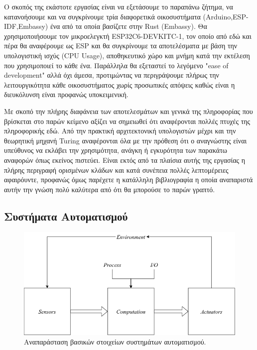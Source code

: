 Ο σκοπός της εκάστοτε εργασίας είναι να εξετάσουμε το παραπάνω ζήτημα,
να κατανοήσουμε και να συγκρίνουμε τρία διαφορετικά οικοσυστήματα
(Arduino,ESP-IDF,Embassy) ένα από τα οποία βασίζετε στην Rust
(Embassy). Θα χρησιμοποιήσουμε τον μικροελεγκτή ESP32C6-DEVKITC-1, τον
οποίο από εδώ και πέρα θα αναφέρουμε ως ESP και θα συγκρίνουμε τα
αποτελέσματα με βάση την υπολογιστική ισχύς (CPU Usage), αποθηκευτικό
χώρο και μνήμη κατά την εκτέλεση που χρησιμοποιεί το κάθε ένα. Παράλληλα
θα εξεταστεί το λεγόμενο "ease of development" αλλά όχι άμεσα,
προτιμώντας να περιγράψουμε πλήρως την λειτουργικότητα κάθε οικοσυστήματος χωρίς
προσωπικές απόψεις καθώς είναι η διευκόλυνση είναι προφανώς υποκειμενική.

Με σκοπό την πλήρης διαφάνεια των αποτελεσμάτων και γενικά της πληροφορίας
που βρίσκεται στο παρών κείμενο αξίζει να σημειωθεί ότι αναφέρονται πολλές
πτυχές της πληροφορικής εδώ. Από την πρακτική αρχιτεκτονική υπολογιστών μέχρι
και την θεωρητική μηχανή Turing αναφέρονται όλα με την πρόθεση ότι ο αναγνώστης
είναι υπεύθυνος να εκλάβει την χρησιμότητα, ανάγκη ή εγκυρότητα των παρακάτω αναφορών
όπως εκείνος πιστεύει. Είναι εκτός από τα πλαίσια αυτής της εργασίας η πλήρης περιγραφή
ορισμένων κλάδων και κατά συνέπεια πολλές λεπτομέρειες αφαιρόυντε, προφανώς όμως παρέχετε
η κατάλληλη βιβλιογραφία η οποία αναπαριστά αυτήν την γνώση πολύ καλύτερα από ότι θα μπορούσε
το παρών γραπτό.

\subsection{Συστήματα Αυτοματισμού}

\begin{figure}[h!]
\centering
\includegraphics[scale=0.4]{images/introduction/as_elements.png}
\caption{Αναπαράσταση βασικών στοιχείων συστημάτων αυτοματισμού.}
 \label{fig:as_elements}
\end{figure}

